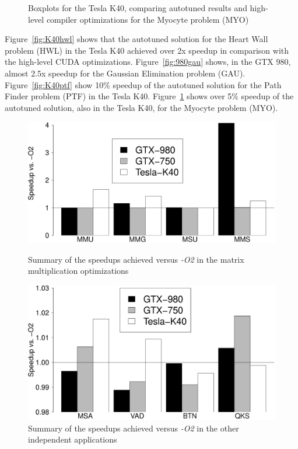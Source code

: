 \begin{figure}[htpb]
\begin{minipage}{.48\textwidth}
        \caption{Boxplots for the Tesla K40, comparing autotuned results and high-level compiler optimizations for the Myocyte problem (MYO)}
        \label{fig:K40myo}
    \end{minipage}%
\end{figure}

Figure~\ref{fig:K40hwl} shows that the autotuned solution for the Heart Wall
problem (HWL) in the Tesla K40 achieved over 2x speedup in comparison with the
high-level CUDA optimizations.  Figure~\ref{fig:980gau} shows, in the GTX 980,
almost 2.5x speedup for the Gaussian Elimination problem (GAU).
Figure~\ref{fig:K40ptf} show 10\% speedup of the autotuned solution for the
Path Finder problem (PTF) in the Tesla K40.  Figure~\ref{fig:K40myo} shows over
5\% speedup of the autotuned solution, also in the Tesla K40, for the Myocyte
problem (MYO).

\begin{figure}[htpb]
    \centering
    \begin{minipage}{.48\textwidth}
        \centering
        \includegraphics[scale=.15]{./images/MatrixSummary.eps}
        \caption{Summary of the speedups achieved versus \emph{-O2} in the matrix multiplication optimizations}
        \label{fig:matrixsummary}
    \end{minipage}%
    \hfill
    \begin{minipage}{.48\textwidth}
        \centering
        \includegraphics[scale=.15]{./images/Summary.eps}
        \caption{Summary of the speedups achieved versus \emph{-O2} in the other independent applications}
        \label{fig:summary}
    \end{minipage}%
\end{figure}

